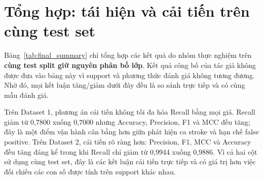 \section{Tổng hợp: tái hiện và cải tiến trên cùng test set}

Bảng~\ref{tab:final_summary} chỉ tổng hợp các kết quả do nhóm thực nghiệm trên \textbf{cùng test split giữ nguyên phân bố lớp}. Kết quả công bố của tác giả không được đưa vào bảng này vì support và phương thức đánh giá không tương đương. Nhờ đó, mọi kết luận tăng/giảm dưới đây đều là so sánh trực tiếp và có cùng mẫu đánh giá.

\begin{table}[H]
\centering
\scriptsize
\caption{Tổng hợp baseline tái hiện và phương án cải tiến của nhóm trên cùng test set}
\label{tab:final_summary}
\end{table}

Trên Dataset 1, phương án cải tiến không tối đa hóa Recall bằng mọi giá. Recall giảm từ 0,7800 xuống 0,7000 nhưng Accuracy, Precision, F1 và MCC đều tăng; đây là một điểm vận hành cân bằng hơn giữa phát hiện ca stroke và hạn chế false positive. Trên Dataset 2, cải tiến rõ ràng hơn: Precision, F1, MCC và Accuracy đều tăng đáng kể trong khi Recall chỉ giảm từ 0,9944 xuống 0,9886. Vì cả hai cột sử dụng cùng test set, đây là các kết luận cải tiến trực tiếp và có giá trị hơn việc đối chiếu các con số được tính trên support khác nhau.

